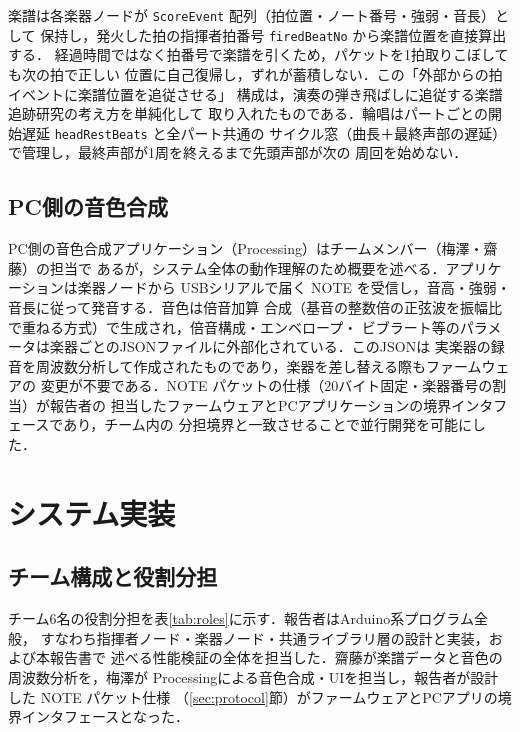 \documentclass[uplatex,dvipdfmx]{jlreq}
\newcommand{\code}[1]{\texttt{#1}}
\begin{document}
楽譜は各楽器ノードが \code{ScoreEvent} 配列（拍位置・ノート番号・強弱・音長）として
保持し，発火した拍の指揮者拍番号 \code{firedBeatNo} から楽譜位置を直接算出する．
経過時間ではなく拍番号で楽譜を引くため，パケットを1拍取りこぼしても次の拍で正しい
位置に自己復帰し，ずれが蓄積しない．この「外部からの拍イベントに楽譜位置を追従させる」
構成は，演奏の弾き飛ばしに追従する楽譜追跡研究\cite{ref:beat}の考え方を単純化して
取り入れたものである．輪唱はパートごとの開始遅延 \code{headRestBeats} と全パート共通の
サイクル窓（曲長＋最終声部の遅延）で管理し，最終声部が1周を終えるまで先頭声部が次の
周回を始めない．

\subsection{PC側の音色合成}\label{sec:pcsound}

PC側の音色合成アプリケーション（Processing）はチームメンバー（梅澤・齋藤）の担当で
あるが，システム全体の動作理解のため概要を述べる．アプリケーションは楽器ノードから
USBシリアルで届く NOTE を受信し，音高・強弱・音長に従って発音する．音色は倍音加算
合成（基音の整数倍の正弦波を振幅比で重ねる方式）で生成され，倍音構成・エンベロープ・
ビブラート等のパラメータは楽器ごとのJSONファイルに外部化されている．このJSONは
実楽器の録音を周波数分析して作成されたものであり，楽器を差し替える際もファームウェアの
変更が不要である．NOTE パケットの仕様（20バイト固定・楽器番号の割当）が報告者の
担当したファームウェアとPCアプリケーションの境界インタフェースであり，チーム内の
分担境界と一致させることで並行開発を可能にした．

\section{システム実装}\label{sec:impl}

\subsection{チーム構成と役割分担}\label{sec:roles}

チーム6名の役割分担を表\ref{tab:roles}に示す．報告者はArduino系プログラム全般，
すなわち指揮者ノード・楽器ノード・共通ライブラリ層の設計と実装，および本報告書で
述べる性能検証の全体を担当した．齋藤が楽譜データと音色の周波数分析を，梅澤が
Processingによる音色合成・UIを担当し，報告者が設計した NOTE パケット仕様
（\ref{sec:protocol}節）がファームウェアとPCアプリの境界インタフェースとなった．
\end{document}
